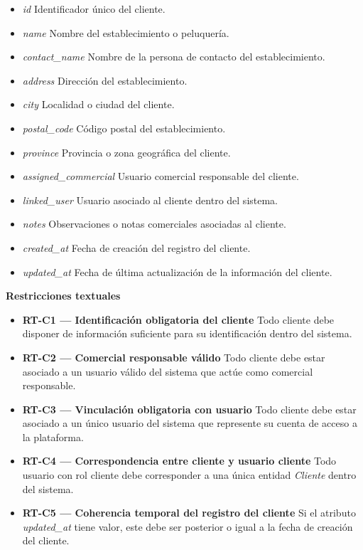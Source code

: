 \begin{itemize}

      \item \textit{id}
            Identificador único del cliente.
      \item \textit{name}
            Nombre del establecimiento o peluquería.
      \item \textit{contact\_name}
            Nombre de la persona de contacto del establecimiento.
      \item \textit{address}
            Dirección del establecimiento.
      \item \textit{city}
            Localidad o ciudad del cliente.
      \item \textit{postal\_code}
            Código postal del establecimiento.
      \item \textit{province}
            Provincia o zona geográfica del cliente.
      \item \textit{assigned\_commercial}
            Usuario comercial responsable del cliente.
      \item \textit{linked\_user}
            Usuario asociado al cliente dentro del sistema.
      \item \textit{notes}
            Observaciones o notas comerciales asociadas al cliente.
      \item \textit{created\_at}
            Fecha de creación del registro del cliente.
      \item \textit{updated\_at}
            Fecha de última actualización de la información del cliente.

\end{itemize}

\textbf{Restricciones textuales}

\begin{itemize}

      \item \textbf{RT-C1 — Identificación obligatoria del cliente}
            Todo cliente debe disponer de información suficiente para su identificación dentro del sistema.
      \item \textbf{RT-C2 — Comercial responsable válido}
            Todo cliente debe estar asociado a un usuario válido del sistema que actúe como comercial responsable.
      \item \textbf{RT-C3 — Vinculación obligatoria con usuario}
            Todo cliente debe estar asociado a un único usuario del sistema que represente su cuenta de acceso a la plataforma.
      \item \textbf{RT-C4 — Correspondencia entre cliente y usuario cliente}
            Todo usuario con rol cliente debe corresponder a una única entidad \textit{Cliente} dentro del sistema.
      \item \textbf{RT-C5 — Coherencia temporal del registro del cliente}
            Si el atributo \textit{updated\_at} tiene valor, este debe ser posterior o igual a la fecha de creación del cliente.

\end{itemize}

